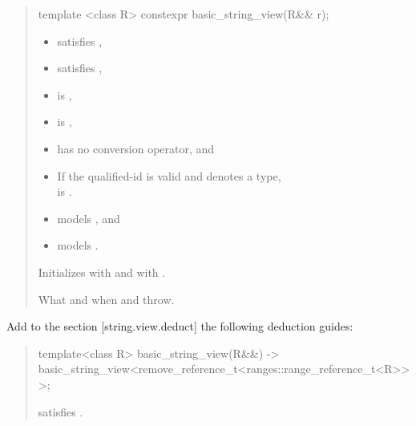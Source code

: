 \documentclass{wg21}
\begin{document}
\begin{quote}
\begin{addedblock}
\begin{itemdecl}
template <class R>
constexpr basic_string_view(R&& r);

\end{itemdecl}

\begin{itemdescr}
    \constraints
    \begin{itemize}
        \item {} satisfies ,
        \item {} satisfies ,
        \item {} is ,
        \item {} is ,
        \item {} has no  conversion operator, and
        \item If the qualified-id  is valid and denotes a type,\\  is .
    \end{itemize}
 
	\expects
	 \begin{itemize}
		\item {} models , and
		\item {} models .
	\end{itemize}

    \effects
    Initializes  with  and  with .


    \throws
    What and when  and  throw.



\end{itemdescr}

\end{addedblock}
\end{quote}


Add to the section [string.view.deduct] the following deduction guides:



\begin{quote}
\begin{addedblock}

\begin{itemdecl}
template<class R>
basic_string_view(R&&)
-> basic_string_view<remove_reference_t<ranges::range_reference_t<R>>>;
\end{itemdecl}
\begin{itemdescr}
\constraints
{} satisfies .
\end{itemdescr}

\end{addedblock}
\end{quote}
\end{document}
